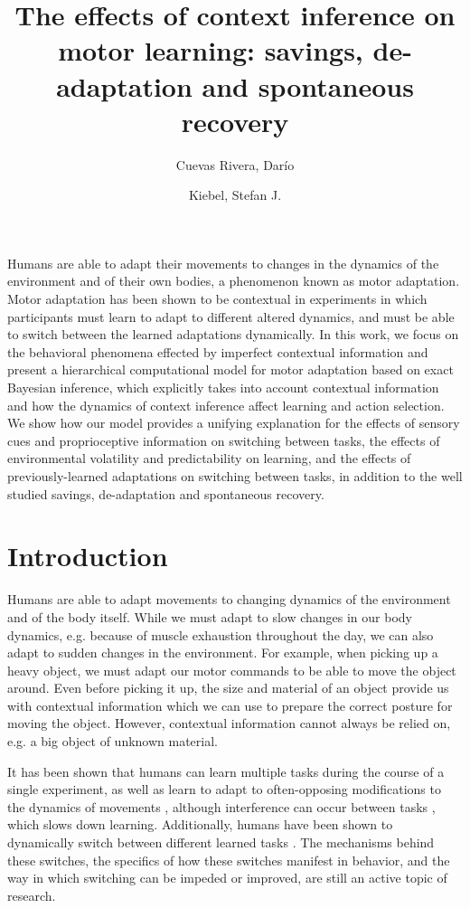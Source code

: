 \documentclass[a4paper,doc,floatsintext,natbib]{apa6}
\title{The effects of context inference on motor learning: savings, de-adaptation and spontaneous recovery}
\author[1,2]{Cuevas Rivera, Darío}
\author[1,2]{Kiebel, Stefan J.}
\affil[1]{Chair of Neuroimaging, Faculty of Psychology. Technische Universität Dresden, 01062 Dresden, Germany.}
\affil[2]{Centre for Tactile Internet with Human-in-the-Loop (CeTI)}
\affiliation{~}
\begin{document}
\maketitle

 Humans are able to adapt their movements to changes in the dynamics of the environment and of their own bodies, a phenomenon known as motor adaptation. Motor adaptation has been shown to be contextual in experiments in which participants must learn to adapt to different altered dynamics, and must be able to switch between the learned adaptations dynamically. In this work, we focus on the behavioral phenomena effected by imperfect contextual information and present a hierarchical computational model for motor adaptation based on exact Bayesian inference, which explicitly takes into account contextual information and how the dynamics of context inference affect learning and action selection. We show how our model provides a unifying explanation for the effects of sensory cues and proprioceptive information on switching between tasks, the effects of environmental volatility and predictability on learning, and the effects of previously-learned adaptations on switching between tasks, in addition to the well studied savings, de-adaptation and spontaneous recovery.

\section{Introduction}
Humans are able to adapt movements to changing dynamics of the environment and of the body itself. While we must adapt to slow changes in our body dynamics, e.g. because of muscle exhaustion throughout the day, we can also adapt to sudden changes in the environment. For example, when picking up a heavy object, we must adapt our motor commands to be able to move the object around. Even before picking it up, the size and material of an object provide us with contextual information which we can use to prepare the correct posture for moving the object. However, contextual information cannot always be relied on, e.g. a big object of unknown material.

It has been shown that humans can learn multiple tasks during the course of a single experiment, as well as learn to adapt to often-opposing modifications to the dynamics of movements \citep[e.g.][]{Gandolfo_Motor_1996,Shadmehr_Functional_1997}, although interference can occur between tasks \citep[e.g.][]{Brashers-Krug_Consolidation_1996,Sing_Reduction_2010}, which slows down learning. Additionally, humans have been shown to dynamically switch between different learned tasks \citep[e.g.][]{Davidson_Scaling_2004,Ethier_Spontaneous_2008,Lee_Dual_2009}. The mechanisms behind these switches, the specifics of how these switches manifest in behavior, and the way in which switching can be impeded or improved, are still an active topic of research.
\end{document}
